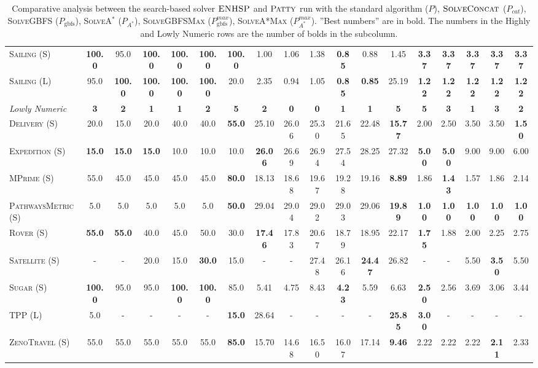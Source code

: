 \documentclass[11pt,landscape]{article}
\begin{document}
\begin{table*}[tb]
{\begin{tabular}{|l||cccccc||cccccc||ccccc||}
\textsc{Sailing} (S)&\textbf{100.0}&95.0&\textbf{100.0}&\textbf{100.0}&\textbf{100.0}&\textbf{100.0}&1.00&1.06&1.38&\textbf{0.85}&0.88&1.45&\textbf{3.37}&\textbf{3.37}&\textbf{3.37}&\textbf{3.37}&\textbf{3.37}\\
\textsc{Sailing} (L)&95.0&\textbf{100.0}&\textbf{100.0}&\textbf{100.0}&\textbf{100.0}&20.0&2.35&0.94&1.05&\textbf{0.85}&\textbf{0.85}&25.19&\textbf{1.22}&\textbf{1.22}&\textbf{1.22}&\textbf{1.22}&\textbf{1.22}
\\\hline
\textit{Lowly Numeric}&\textbf{3}&\textbf{2}&\textbf{1}&\textbf{1}&\textbf{2}&\textbf{5}&\textbf{2}&\textbf{0}&\textbf{0}&\textbf{1}&\textbf{1}&\textbf{5}&\textbf{5}&\textbf{3}&\textbf{1}&\textbf{3}&\textbf{2}\\\hline
\textsc{Delivery} (S)&20.0&15.0&20.0&40.0&40.0&\textbf{55.0}&25.10&26.06&25.30&21.65&22.48&\textbf{15.77}&2.00&2.50&3.50&3.50&\textbf{1.50}\\
\textsc{Expedition} (S)&\textbf{15.0}&\textbf{15.0}&\textbf{15.0}&10.0&10.0&10.0&\textbf{26.06}&26.69&26.94&27.54&28.25&27.32&\textbf{5.00}&\textbf{5.00}&9.00&9.00&6.00\\
\textsc{MPrime} (S)&55.0&45.0&45.0&45.0&45.0&\textbf{80.0}&18.13&18.68&19.67&19.28&19.16&\textbf{8.89}&1.86&\textbf{1.43}&1.57&1.86&2.14\\
\textsc{PathwaysMetric} (S)&5.0&5.0&5.0&5.0&5.0&\textbf{50.0}&29.04&29.04&29.02&29.03&29.06&\textbf{19.89}&\textbf{1.00}&\textbf{1.00}&\textbf{1.00}&\textbf{1.00}&\textbf{1.00}\\
\textsc{Rover} (S)&\textbf{55.0}&\textbf{55.0}&40.0&45.0&50.0&30.0&\textbf{17.46}&17.83&20.67&18.79&18.95&22.17&\textbf{1.75}&1.88&2.00&2.25&2.75\\
\textsc{Satellite} (S)&-&-&20.0&15.0&\textbf{30.0}&15.0&-&-&27.48&26.16&\textbf{24.47}&26.82&-&-&5.50&\textbf{3.50}&5.50\\
\textsc{Sugar} (S)&\textbf{100.0}&95.0&95.0&\textbf{100.0}&\textbf{100.0}&85.0&5.41&4.75&8.43&\textbf{4.23}&5.59&6.63&\textbf{2.50}&2.56&3.69&3.06&3.44\\
\textsc{TPP} (L)&5.0&-&-&-&-&\textbf{15.0}&28.64&-&-&-&-&\textbf{25.85}&\textbf{3.00}&-&-&-&-\\
\textsc{ZenoTravel} (S)&55.0&55.0&55.0&55.0&55.0&\textbf{85.0}&15.70&14.68&16.50&16.07&17.14&\textbf{9.46}&2.22&2.22&2.22&\textbf{2.11}&2.33
\\\hline

        \end{tabular}}
        \caption{Comparative analysis between the search-based solver $\textsc{ENHSP}$ and  $\textsc{Patty}$ run with the standard algorithm ($P$),  $\textsc{SolveConcat}$ ($P_{cat}$), \textsc{SolveGBFS} ($P_\text{gbfs}$), \textsc{SolveA}$^*$ ($P_{A^*}$), \textsc{SolveGBFSMax} ($P_\text{gbfs}^{max}$), \textsc{SolveA*Max} ($P_{A^*}^{max}$). ''Best numbers'' are in bold.  The numbers in the Highly and Lowly Numeric rows are the number of bolds in the subcolumn.}
        \label{tab:experiments}
        \end{table*}
        
\end{document}
